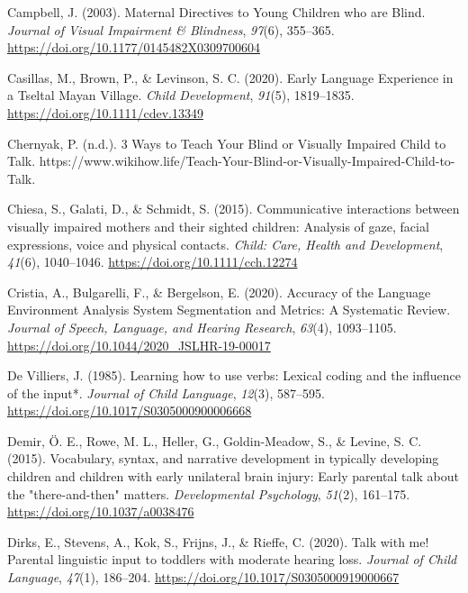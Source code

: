 \documentclass[
  man,floatsintext]{apa6}
\newlength{\cslhangindent}
\newlength{\cslentryspacingunit} %
\newenvironment{CSLReferences}[2] %
 {%
  \setlength{\parindent}{0pt}
  \ifodd #1
  \let\oldpar\par
  \def\par{\hangindent=\cslhangindent\oldpar}
  \fi
  \setlength{\parskip}{#2\cslentryspacingunit}
 }%
 {}
\begin{document}
\begin{CSLReferences}{1}{0}
\leavevmode{}%
Campbell, J. (2003). Maternal {Directives} to {Young Children} who are {Blind}. \emph{Journal of Visual Impairment \& Blindness}, \emph{97}(6), 355--365. \url{https://doi.org/10.1177/0145482X0309700604}

\leavevmode{}%
Casillas, M., Brown, P., \& Levinson, S. C. (2020). Early {Language Experience} in a {Tseltal Mayan Village}. \emph{Child Development}, \emph{91}(5), 1819--1835. \url{https://doi.org/10.1111/cdev.13349}

\leavevmode{}%
Chernyak, P. (n.d.). 3 {Ways} to {Teach Your Blind} or {Visually Impaired Child} to {Talk}. https://www.wikihow.life/Teach-Your-Blind-or-Visually-Impaired-Child-to-Talk.

\leavevmode{}%
Chiesa, S., Galati, D., \& Schmidt, S. (2015). Communicative interactions between visually impaired mothers and their sighted children: Analysis of gaze, facial expressions, voice and physical contacts. \emph{Child: Care, Health and Development}, \emph{41}(6), 1040--1046. \url{https://doi.org/10.1111/cch.12274}

\leavevmode{}%
Cristia, A., Bulgarelli, F., \& Bergelson, E. (2020). Accuracy of the {Language Environment Analysis System Segmentation} and {Metrics}: {A Systematic Review}. \emph{Journal of Speech, Language, and Hearing Research}, \emph{63}(4), 1093--1105. \url{https://doi.org/10.1044/2020_JSLHR-19-00017}

\leavevmode{}%
De Villiers, J. (1985). Learning how to use verbs: Lexical coding and the influence of the input*. \emph{Journal of Child Language}, \emph{12}(3), 587--595. \url{https://doi.org/10.1017/S0305000900006668}

\leavevmode{}%
Demir, Ö. E., Rowe, M. L., Heller, G., Goldin-Meadow, S., \& Levine, S. C. (2015). Vocabulary, syntax, and narrative development in typically developing children and children with early unilateral brain injury: Early parental talk about the "there-and-then" matters. \emph{Developmental Psychology}, \emph{51}(2), 161--175. \url{https://doi.org/10.1037/a0038476}

\leavevmode{}%
Dirks, E., Stevens, A., Kok, S., Frijns, J., \& Rieffe, C. (2020). Talk with me! {Parental} linguistic input to toddlers with moderate hearing loss. \emph{Journal of Child Language}, \emph{47}(1), 186--204. \url{https://doi.org/10.1017/S0305000919000667}


\end{CSLReferences}
\end{document}
